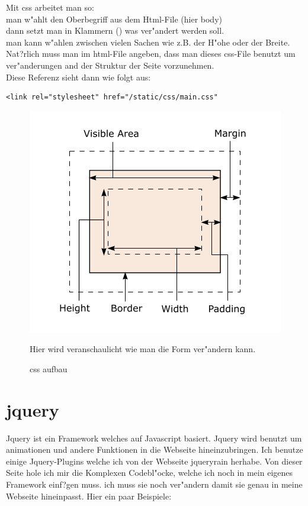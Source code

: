 \documentclass{article}
\begin{document}
Mit css arbeitet man so:\\
man w"ahlt den Oberbegriff aus dem Html-File (hier body)\\
dann setzt man in Klammern ({}) was ver"andert werden soll.\\
man kann w"ahlen zwischen vielen Sachen wie z.B. der H"ohe oder der Breite.\\
Nat?rlich muss man im html-File angeben, dass man dieses css-File benutzt um
ver"anderungen and der Struktur der Seite vorzunehmen.\\
Diese Referenz sieht dann wie folgt aus:


\begin{lstlisting}
<link rel="stylesheet" href="/static/css/main.css"
\end{lstlisting}


\begin{figure}[ht]
    \centering
    \includegraphics[width=.7\linewidth]{css-box}
    \caption{css aufbau}
    \label{fig:sub1}{Hier wird veranschaulicht wie man die Form ver"andern kann.}
    \end{figure}

\cleardoublepage


\section{jquery}






Jquery ist ein Framework welches auf Javascript basiert.
Jquery wird benutzt um animationen und andere Funktionen in die Webseite hineinzubringen.
Ich benutze einige Jquery-Plugins welche ich von der Webseite jqueryrain herhabe.
Von dieser Seite hole ich mir die Komplexen Codebl"ocke, welche ich noch in mein eigenes Framework einf?gen muss.
ich muss sie noch ver"andern damit sie genau in meine Webseite hineinpasst.
Hier ein paar Beispiele:
\end{document}
